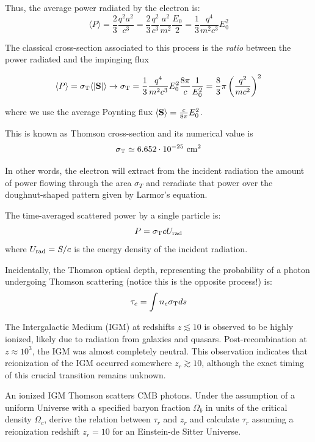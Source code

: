 Thus, the average power radiated by the electron is:
%
\[
\langle P \rangle = \frac{2}{3} \frac{q^2 a^2}{c^3} = \frac{2}{3} \frac{q^2}{c^3} \frac{a^2}{m^2} \frac{E_0}{2} = \frac{1}{3} \frac{q^4}{m^2 c^3} E_0^2
\]

The classical cross-section associated to this process is the \emph{ratio} between the power radiated and the impinging flux
%
\begin{remark}
\begin{equation*}
\langle P \rangle = \sigma_{\rm T} \langle | \vb S | \rangle \rightarrow \sigma_{\rm T} = \frac{1}{3} \frac{q^4}{m^2 c^3} E_0^2 \frac{8\pi}{c} \frac{1}{E_0^2} = \frac{8}{3} \pi \left( \frac{q^2}{m c^2} \right)^2
\end{equation*}
\end{remark}
%
where we use the average Poynting flux $\langle \vb S \rangle = \frac{c}{8\pi} E_0^2$.

This is known as Thomson cross-section and its numerical value is 
%
\begin{equation*}
\sigma_{\rm T} \simeq 6.652 \cdot 10^{-25}~\text{cm}^2
\end{equation*}

In other words, the electron will extract from the incident radiation the amount of power flowing through the area $\sigma_T$ and reradiate that power over the doughnut-shaped pattern given by Larmor’s equation.



The time-averaged scattered power by a single particle is:
%
\[
P = \sigma_{\rm T} c U_{\rm rad}
\]
%
where \( U_{\rm rad} = S /c \) is the energy density of the incident radiation.

Incidentally, the Thomson optical depth, representing the probability of a photon undergoing Thomson scattering (notice this is the opposite process!) is:
%
\[
\tau_e = \int n_e \sigma_{\rm T} ds
\]

\begin{problem}
The Intergalactic Medium (IGM) at redshifts \( z \lesssim 10 \) is observed to be highly ionized, likely due to radiation from galaxies and quasars. Post-recombination at \( z \approx 10^3 \), the IGM was almost completely neutral. This observation indicates that reionization of the IGM occurred somewhere \( z_r \gtrsim 10 \), although the exact timing of this crucial transition remains unknown. 

An ionized IGM Thomson scatters CMB photons. Under the assumption of a uniform Universe with a specified baryon fraction \( \Omega_b \) in units of the critical density \( \Omega_c \), derive the relation between \( \tau_r \) and \( z_r \) and calculate \( \tau_r \) assuming a reionization redshift \( z_r = 10 \) for an Einstein-de Sitter Universe.
\end{problem}

